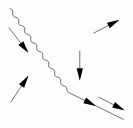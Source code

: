 \begin{equation}
\begin{gathered}
\begin{tikzpicture}[x=0.75pt,y=0.75pt,yscale=-1,xscale=1]
            \draw    (146,80.67) .. controls (148.32,81.08) and (149.28,82.44) .. (148.87,84.76) .. controls (148.46,87.08) and (149.41,88.45) .. (151.73,88.86) .. controls (154.05,89.27) and (155.01,90.64) .. (154.6,92.96) .. controls (154.19,95.28) and (155.15,96.64) .. (157.47,97.05) .. controls (159.79,97.46) and (160.75,98.83) .. (160.34,101.15) .. controls (159.93,103.47) and (160.88,104.83) .. (163.2,105.24) .. controls (165.52,105.65) and (166.48,107.02) .. (166.07,109.34) .. controls (165.66,111.66) and (166.62,113.03) .. (168.94,113.44) .. controls (171.26,113.85) and (172.22,115.21) .. (171.81,117.53) .. controls (171.4,119.85) and (172.35,121.22) .. (174.67,121.63) .. controls (176.99,122.04) and (177.95,123.4) .. (177.54,125.72) .. controls (177.13,128.04) and (178.09,129.41) .. (180.41,129.82) .. controls (182.73,130.23) and (183.69,131.6) .. (183.28,133.92) .. controls (182.87,136.24) and (183.82,137.6) .. (186.14,138.01) .. controls (188.46,138.42) and (189.42,139.79) .. (189.01,142.11) .. controls (188.6,144.43) and (189.56,145.8) .. (191.88,146.21) .. controls (194.2,146.62) and (195.15,147.98) .. (194.74,150.3) .. controls (194.33,152.62) and (195.29,153.99) .. (197.61,154.4) .. controls (199.93,154.81) and (200.89,156.17) .. (200.48,158.49) -- (202,160.67) -- (202,160.67) ;
            \draw    (255,186.67) -- (202,160.67) ;
            \draw [shift={(228.5,173.67)}, rotate = 206.13] [fill={rgb, 255:red, 0; green, 0; blue, 0 }  ][line width=0.08]  [draw opacity=0] (12,-3) -- (0,0) -- (12,3) -- cycle    ;
            \draw    (145,98.67) -- (162.77,121.42) ;
            \draw [shift={(164,123)}, rotate = 232.02] [fill={rgb, 255:red, 0; green, 0; blue, 0 }  ][line width=0.08]  [draw opacity=0] (12,-3) -- (0,0) -- (12,3) -- cycle    ;
            \draw    (147,170) -- (162.89,146.33) ;
            \draw [shift={(164,144.67)}, rotate = 123.86] [fill={rgb, 255:red, 0; green, 0; blue, 0 }  ][line width=0.08]  [draw opacity=0] (12,-3) -- (0,0) -- (12,3) -- cycle    ;
            \draw    (249.23,92.09) -- (226,104.17) ;
            \draw [shift={(251,91.17)}, rotate = 152.53] [fill={rgb, 255:red, 0; green, 0; blue, 0 }  ][line width=0.08]  [draw opacity=0] (12,-3) -- (0,0) -- (12,3) -- cycle    ;
            \draw    (254.23,177.24) -- (231,165.17) ;
            \draw [shift={(256,178.17)}, rotate = 207.47] [fill={rgb, 255:red, 0; green, 0; blue, 0 }  ][line width=0.08]  [draw opacity=0] (12,-3) -- (0,0) -- (12,3) -- cycle    ;
            \draw    (213,121) -- (213,147.67) ;
            \draw [shift={(213,149.67)}, rotate = 270] [fill={rgb, 255:red, 0; green, 0; blue, 0 }  ][line width=0.08]  [draw opacity=0] (12,-3) -- (0,0) -- (12,3) -- cycle    ;
            

\end{tikzpicture}
\end{gathered}
\end{equation}
